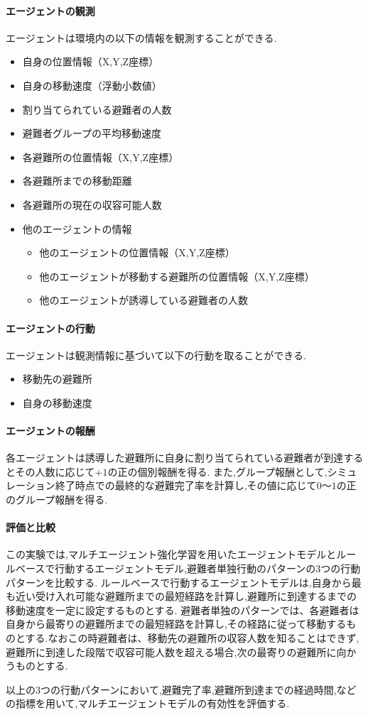 \paragraph{エージェントの観測}
エージェントは環境内の以下の情報を観測することができる.
\begin{itemize}
  \item 自身の位置情報（X,Y,Z座標）
  \item 自身の移動速度（浮動小数値）
  \item 割り当てられている避難者の人数
  \item 避難者グループの平均移動速度
  \item 各避難所の位置情報（X,Y,Z座標）
  \item 各避難所までの移動距離
  \item 各避難所の現在の収容可能人数
  \item 他のエージェントの情報
  \begin{itemize}
    \item 他のエージェントの位置情報（X,Y,Z座標）
    \item 他のエージェントが移動する避難所の位置情報（X,Y,Z座標）
    \item 他のエージェントが誘導している避難者の人数
  \end{itemize}
\end{itemize}
  
 
\paragraph{エージェントの行動}
エージェントは観測情報に基づいて以下の行動を取ることができる.
\begin{itemize}
  \item 移動先の避難所
  \item 自身の移動速度
\end{itemize}

\paragraph{エージェントの報酬}
各エージェントは誘導した避難所に自身に割り当てられている避難者が到達するとその人数に応じて$+1$の正の個別報酬を得る.
また,グループ報酬として,シミュレーション終了時点での最終的な避難完了率を計算し,その値に応じて$0$～$1$の正のグループ報酬を得る.

\paragraph{評価と比較}
この実験では,マルチエージェント強化学習を用いたエージェントモデルとルールベースで行動するエージェントモデル,避難者単独行動のパターンの3つの行動パターンを比較する.
ルールベースで行動するエージェントモデルは,自身から最も近い受け入れ可能な避難所までの最短経路を計算し,避難所に到達するまでの移動速度を一定に設定するものとする.
避難者単独のパターンでは、各避難者は自身から最寄りの避難所までの最短経路を計算し,その経路に従って移動するものとする.なおこの時避難者は、移動先の避難所の収容人数を知ることはできず,避難所に到達した段階で収容可能人数を超える場合,次の最寄りの避難所に向かうものとする.\par

以上の3つの行動パターンにおいて,避難完了率,避難所到達までの経過時間,などの指標を用いて,マルチエージェントモデルの有効性を評価する.